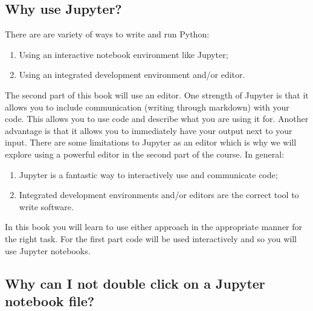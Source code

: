 \subsection{Why use Jupyter?}

There are are variety of ways to write and run Python:
\begin{enumerate}

\item 

Using an interactive notebook environment like Jupyter;

\item 

Using an integrated development environment and/or editor.

\end{enumerate}


The second part of this book will use an editor.
One strength of Jupyter is that it allows you to include communication (writing
through markdown) with your code. This allows you to use code and describe what
you are using it for.
Another advantage is that it allows you to immediately have your output next to your input.
There are some limitations to Jupyter as an editor which is why we will explore
using a powerful editor in the second part of the course.
In general:

\begin{enumerate}

\item 

Jupyter is a fantastic way to interactively use and communicate code;

\item 

Integrated development environments and/or editors are the correct tool to
write software.

\end{enumerate}


In this book you will learn to use either approach in the appropriate manner
for the right task. For the first part code will be used interactively and so
you will use Jupyter notebooks.

\subsection{Why can I not double click on a Jupyter notebook file?}

